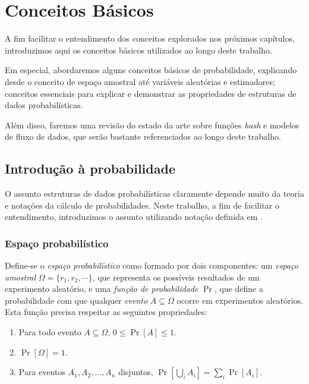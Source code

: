 \section{Conceitos Básicos}\label{sec:concepts}

A fim facilitar o entendimento dos conceitos explorados nos próximos capítulos, introduzimos aqui os conceitos básicos utilizados ao longo deste trabalho.

Em especial, abordaremos alguns conceitos básicos de probabilidade, explicando desde o conceito de espaço amostral até variáveis aleatórias e estimadores; conceitos essenciais para explicar e demonstrar as propriedades de estruturas de dados probabilísticas. 

Além disso, faremos uma revisão do estado da arte sobre funções \emph{hash} e modelos de fluxo de dados, que serão bastante referenciados ao longo deste trabalho.

\subsection{Introdução à probabilidade}

O assunto estruturas de dados probabilísticas claramente depende muito da teoria e notações da cálculo de probabilidades. Neste trabalho, a fim de facilitar o entendimento, introduzimos o assunto utilizando notação definida em \cite{figueiredo2007randomizados}.

\subsubsection{Espaço probabilístico}

Define-se o \emph{espaço probabilístico} como formado por dois componentes: um \emph{espaço amostral} $\Omega = \{r_1, r_2, \cdots\}$, que representa os possíveis resultados de um experimento aleatório, e uma \emph{função de probabilidade} $\Pr$, que define a probabilidade com que qualquer \emph{evento} $A \subseteq \Omega$ ocorre em experimentos aleatórios. Esta função precisa respeitar as seguintes propriedades:

\begin{enumerate}
  \item Para todo evento $A \subseteq \Omega$, $0 \leq \Pr[A] \leq 1$.
  \item $\Pr[\Omega] = 1$.
  \item Para eventos $A_1, A_2, ..., A_n$ disjuntos, $\Pr[\bigcup_i A_i] = \sum_i \Pr[A_i]$.
\end{enumerate}

